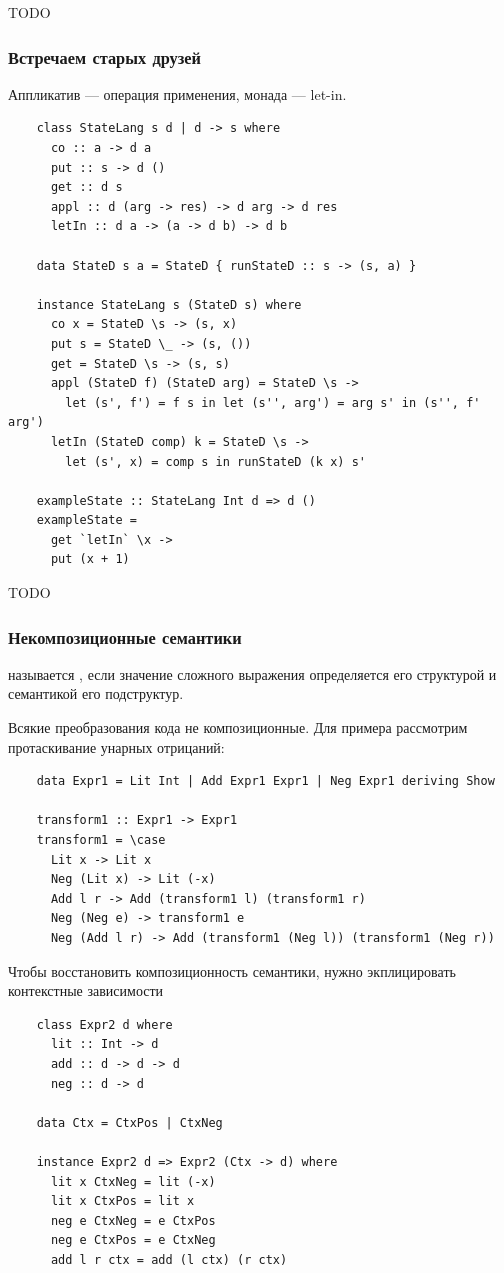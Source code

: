 TODO %

\subsubsection{Встречаем старых друзей}

Аппликатив --- операция применения, монада --- let-in.

\begin{verbatim}
    class StateLang s d | d -> s where
      co :: a -> d a
      put :: s -> d ()
      get :: d s
      appl :: d (arg -> res) -> d arg -> d res
      letIn :: d a -> (a -> d b) -> d b

    data StateD s a = StateD { runStateD :: s -> (s, a) }

    instance StateLang s (StateD s) where
      co x = StateD \s -> (s, x)
      put s = StateD \_ -> (s, ())
      get = StateD \s -> (s, s)
      appl (StateD f) (StateD arg) = StateD \s ->
        let (s', f') = f s in let (s'', arg') = arg s' in (s'', f' arg')
      letIn (StateD comp) k = StateD \s ->
        let (s', x) = comp s in runStateD (k x) s'

    exampleState :: StateLang Int d => d ()
    exampleState =
      get `letIn` \x ->
      put (x + 1)
\end{verbatim}

TODO %

\subsubsection{Некомпозиционные семантики}

 называется , если значение сложного выражения определяется его структурой и семантикой его подструктур.

Всякие преобразования кода не композиционные.
Для примера рассмотрим протаскивание унарных отрицаний:
\begin{verbatim}
    data Expr1 = Lit Int | Add Expr1 Expr1 | Neg Expr1 deriving Show

    transform1 :: Expr1 -> Expr1
    transform1 = \case
      Lit x -> Lit x
      Neg (Lit x) -> Lit (-x)
      Add l r -> Add (transform1 l) (transform1 r)
      Neg (Neg e) -> transform1 e
      Neg (Add l r) -> Add (transform1 (Neg l)) (transform1 (Neg r))
\end{verbatim}

Чтобы восстановить композиционность семантики, нужно экплицировать контекстные зависимости
\begin{verbatim}
    class Expr2 d where
      lit :: Int -> d
      add :: d -> d -> d
      neg :: d -> d

    data Ctx = CtxPos | CtxNeg

    instance Expr2 d => Expr2 (Ctx -> d) where
      lit x CtxNeg = lit (-x)
      lit x CtxPos = lit x
      neg e CtxNeg = e CtxPos
      neg e CtxPos = e CtxNeg
      add l r ctx = add (l ctx) (r ctx)
\end{verbatim}


